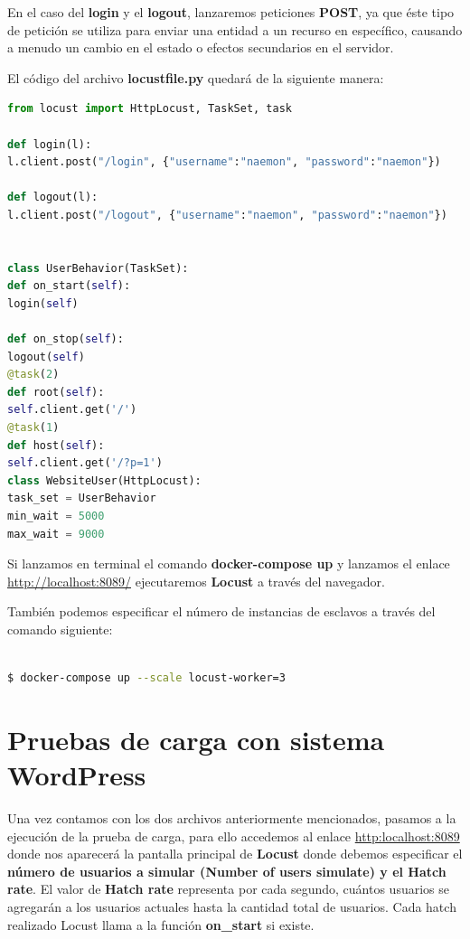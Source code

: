 En el caso del \textbf{login} y el \textbf{logout}, lanzaremos peticiones \textbf{POST}, ya que éste tipo de petición se utiliza para enviar una entidad a un recurso en específico, causando a menudo un cambio en el estado o efectos secundarios en el servidor.

El código del archivo \textbf{locustfile.py} quedará de la siguiente manera:
\begin{lstlisting}[language=Python]
from locust import HttpLocust, TaskSet, task

def login(l):
l.client.post("/login", {"username":"naemon", "password":"naemon"})

def logout(l):
l.client.post("/logout", {"username":"naemon", "password":"naemon"})


class UserBehavior(TaskSet):
def on_start(self):
login(self)

def on_stop(self):
logout(self)
@task(2)
def root(self):
self.client.get('/')
@task(1)
def host(self):
self.client.get('/?p=1')
class WebsiteUser(HttpLocust):
task_set = UserBehavior
min_wait = 5000
max_wait = 9000


\end{lstlisting}

Si lanzamos en terminal el comando \textbf{docker-compose up} y lanzamos el enlace \url{http://localhost:8089/} ejecutaremos \textbf{Locust} a través del navegador.

También podemos especificar el número de instancias de esclavos a través del comando siguiente:
\begin{lstlisting}[language=bash]

$ docker-compose up --scale locust-worker=3

\end{lstlisting}
\newpage
\section{Pruebas de carga con sistema WordPress}
Una vez contamos con los dos archivos anteriormente mencionados, pasamos a la ejecución de la prueba de carga, para ello accedemos al enlace \url{http:localhost:8089} donde nos aparecerá la pantalla principal de \textbf{Locust} donde debemos especificar el \textbf{número de usuarios a simular (Number of users simulate) y el Hatch rate}. El valor de \textbf{Hatch rate} representa por cada segundo, cuántos usuarios se agregarán a los usuarios actuales hasta la cantidad total de usuarios. Cada hatch realizado Locust llama a la función \textbf{on\_start} si existe.\\

